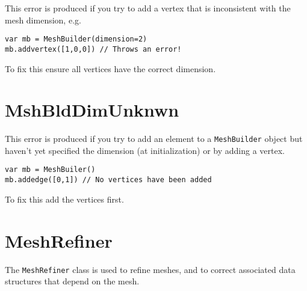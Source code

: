 This error is produced if you try to add a vertex that is inconsistent
with the mesh dimension, e.g.~

\begin{lstlisting}
var mb = MeshBuilder(dimension=2) 
mb.addvertex([1,0,0]) // Throws an error! 
\end{lstlisting}

To fix this ensure all vertices have the correct dimension.

\hypertarget{mshblddimunknwn}{%
\section{MshBldDimUnknwn}\label{mshblddimunknwn}}

This error is produced if you try to add an element to a
\texttt{MeshBuilder} object but haven't yet specified the dimension (at
initialization) or by adding a vertex.

\begin{lstlisting}
var mb = MeshBuiler() 
mb.addedge([0,1]) // No vertices have been added 
\end{lstlisting}

To fix this add the vertices first.

\hypertarget{meshrefiner}{%
\section{MeshRefiner}\label{meshrefiner}}

The \texttt{MeshRefiner} class is used to refine meshes, and to correct
associated data structures that depend on the mesh.

